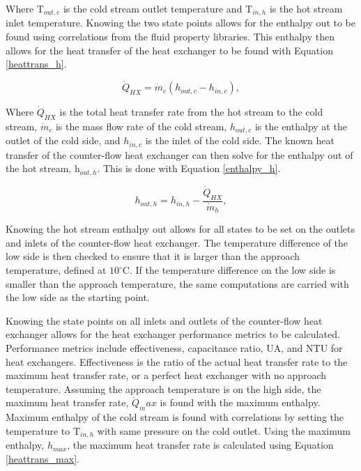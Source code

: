 \begin{paracol}{2}
Where T$_{out,c}$ is the cold stream outlet temperature and T$_{in,h}$ is the hot stream inlet temperature. Knowing the two state points allows for the enthalpy out to be found using correlations from the fluid property libraries. This enthalpy then allows for the heat transfer of the heat exchanger to be found with Equation \ref{heattrans_h}.

\begin{equation}
    \label{heattrans_h}
     \dot{Q}_{HX} = \dot{m}_{c}(h_{out,c}-h_{in,c}),
 \end{equation}

 Where $\dot{Q}_{HX}$ is the total heat transfer rate from the hot stream to the cold stream, $\dot{m}_{c}$ is the mass flow rate of the cold stream, $h_{out,c}$ is the enthalpy at the outlet of the cold side, and $h_{in,c}$ is the inlet of the cold side.
 The known heat transfer of the counter-flow heat exchanger can then solve for the enthalpy out of the hot stream, h$_{out,h}$. This is done with Equation \ref{enthalpy_h}.

 \begin{equation}
    \label{enthalpy_h}
     h_{out,h} = h_{in,h} - \frac{\dot{Q}_{HX}}{\dot{m}_{h}},
 \end{equation}

Knowing the hot stream enthalpy out allows for all states to be set on the outlets and inlets of the counter-flow heat exchanger. The temperature difference of the low side is then checked to ensure that it is larger than the approach temperature, defined at $10^\circ$C. If the temperature difference on the low side is smaller than the approach temperature, the same computations are carried with the low side as the starting point.

Knowing the state points on all inlets and outlets of the counter-flow heat exchanger allows for the heat exchanger performance metrics to be calculated. Performance metrics include effectiveness, capacitance ratio, UA, and NTU for heat exchangers. Effectiveness is the ratio of the actual heat transfer rate to the maximum heat transfer rate, or a perfect heat exchanger with no approach temperature. Assuming the approach temperature is on the high side, the maximum heat transfer rate, $\dot{Q}_max$ is found with the maximum enthalpy. Maximum enthalpy of the cold stream is found with correlations by setting the temperature to T$_{in,h}$ with same pressure on the cold outlet. Using the maximum enthalpy, $h_{max}$, the maximum heat transfer rate is calculated using Equation \ref{heattrans_max}.


\end{paracol}
